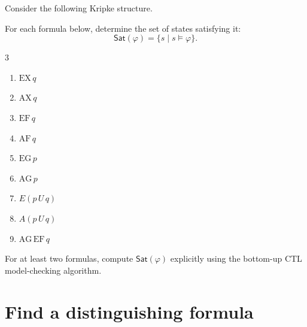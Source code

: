 \documentclass[11pt,a4paper]{tutorial}
\newcommand{\Sat}{\mathsf{Sat}}
\newcommand{\EX}{\mathrm{EX}}
\newcommand{\AX}{\mathrm{AX}}
\newcommand{\EF}{\mathrm{EF}}
\newcommand{\AF}{\mathrm{AF}}
\newcommand{\EG}{\mathrm{EG}}
\newcommand{\AG}{\mathrm{AG}}
\begin{document}
\begin{exercise}
Consider the following Kripke structure.

\begin{center}
\end{center}

For each formula below, determine the set of states satisfying it:
\[
\Sat(\varphi)=\{s\mid s\models\varphi\}.
\]

\begin{multicols}{3}
\begin{enumerate}[label=(\alph*)]
  \item $\EX\,q$
  \item $\AX\,q$
  \item $\EF\,q$
  \item $\AF\,q$
  \item $\EG\,p$
  \item $\AG\,p$
  \item $E(p\,U\,q)$
  \item $A(p\,U\,q)$
  \item $\AG\,\EF\,q$
\end{enumerate}
\end{multicols}

For at least two formulas, compute $\Sat(\varphi)$ explicitly using the
bottom-up CTL model-checking algorithm.
\end{exercise}


\section{Find a distinguishing formula}
\end{document}

